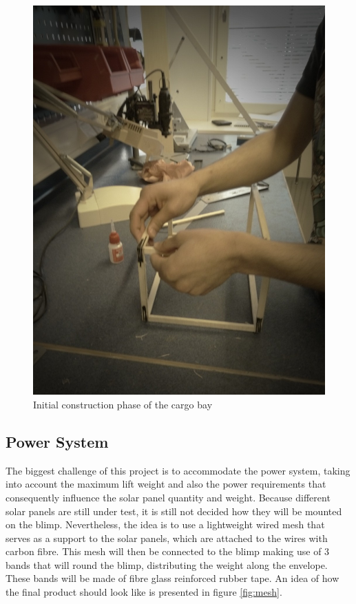 \begin{figure}[th!]
\centering
\includegraphics[scale=0.5]{figures/boxinit.jpg}
\caption{Initial construction phase of the cargo bay}
\label{fig:boxinit}
\end{figure}

\subsection{Power System}

The biggest challenge of this project is to accommodate the power system, taking into account the maximum lift weight and also the power requirements that consequently influence the solar panel quantity and weight. Because different solar panels are still under test, it is still not decided how they will be mounted on the blimp. Nevertheless, the idea is to use a lightweight wired mesh that serves as a support to the solar panels, which are attached to the wires with carbon fibre. This mesh will then be connected to the blimp making use of 3 bands that will round the blimp, distributing the weight along the envelope. These bands will be made of fibre glass reinforced rubber tape. An idea of how the final product should look like is presented in figure \ref{fig:mesh}.

